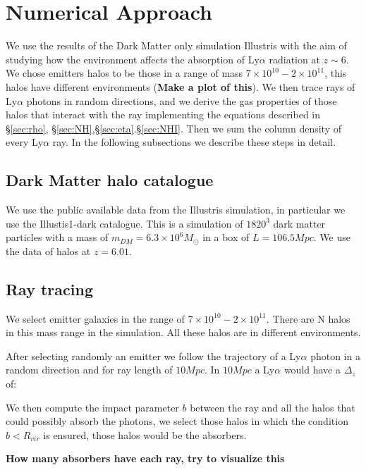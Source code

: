 \documentclass[12pt]{article}
\begin{document}
\section{Numerical Approach}

We use the results of the Dark Matter only simulation Illustris with the aim
of studying how the environment affects the absorption of
Ly$\alpha$ radiation at $z\sim6$. We chose emitters halos to be 
those in a range of mass  $7 \times 10^{10} - 2 \times 10^{11}$, this 
halos have different environments (\textbf{Make a plot of this}).
We then trace rays of Ly$\alpha$ photons in random directions, and we derive
the gas properties of those halos that interact with the ray 
implementing the equations described in \S \ref{sec:rho}, 
\S \ref{sec:NH},\S \ref{sec:eta}.\S \ref{sec:NHI}. Then we sum the column 
density of every Ly$\alpha$ ray. In the following subsections we describe 
these steps in detail.  

\subsection{Dark Matter halo catalogue}

We use the public available data from the Illustris simulation, in particular we use 
the Illustis1-dark catalogue. This is a simulation of $1820^3$ dark matter particles
with a mass of $m_{DM}=6.3 \times 10^6 M_{\odot}$ in a box of $L=106.5 Mpc$. We use 
the data of halos at $z = 6.01$.

\subsection{Ray tracing}

We select emitter galaxies in the range of $7 \times 10^{10} - 2 \times 10^{11}$.
There are N halos in this mass range in the simulation. All these halos
are in different environments.

After selecting randomly an emitter we follow the trajectory of a Ly$\alpha$ photon
in a random direction and for ray length of $10 Mpc$. In $10 Mpc$ a Ly$\alpha$ would
have a $\Delta_z$ of: 


We then compute the impact parameter $b$ between the ray and all the halos that could
possibly absorb the photons, we select those halos in which the condition $b<R_{vir}$
is ensured, those halos would be the absorbers.



\textbf{How many absorbers have each ray, try to visualize this}
\end{document}
